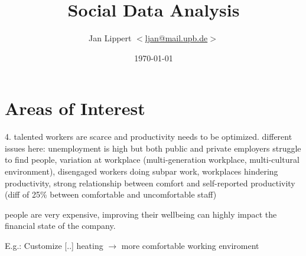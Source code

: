 \documentclass[journal,10pt]{IEEEtran}
\title{Social Data Analysis}
\author{Jan Lippert \(<\)\href{mailt:ljan@mail.upb.de}{ljan@mail.upb.de}\(>\)}
\date{\today}
\begin{document}
\maketitle

%




\section{Areas of Interest}









4. talented workers are scarce and productivity needs to be optimized. different issues here: unemployment is high but both public and private employers struggle to find people, variation at workplace (multi-generation workplace, multi-cultural environment), disengaged workers doing subpar work, workplaces hindering productivity, strong relationship between comfort and self-reported productivity (diff of 25\% between comfortable and uncomfortable staff)\cite{hub13}

people are very expensive, improving their wellbeing can highly impact the financial state of the company. \cite{hub13}


E.g.: Customize [..] heating \(\rightarrow\) more comfortable working enviroment\cite{iotagenda}

% 

  

\end{document}
